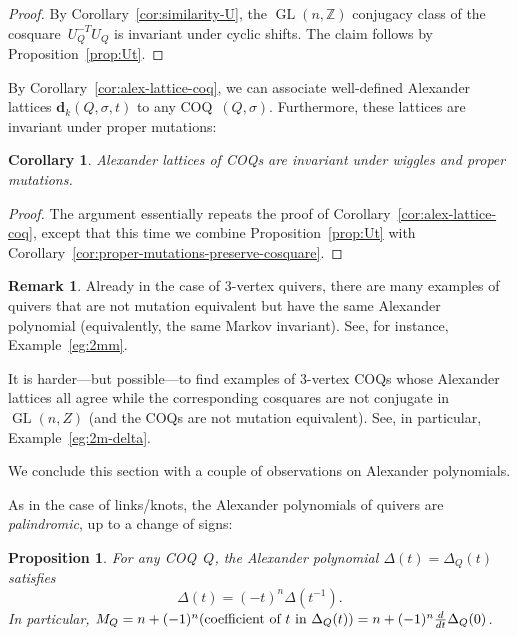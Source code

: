 \documentclass[11pt, letterpaper]{amsart}
\newtheorem{proposition}[theorem]{Proposition}
\newtheorem{corollary}[theorem]{Corollary}
\theoremstyle{definition}
\newtheorem{remark}[theorem]{Remark}
\numberwithin{equation}{section}
\def\ZZ{{\mathbb Z}}
\def\dd{{\mathbf{d}}}
\def\GL{{\operatorname{GL}}}
\begin{document}
\begin{proof}
By Corollary~\ref{cor:similarity-U}, the $\GL(n,\ZZ)$ conjugacy class 
of the cosquare~$U_Q^{-T}U_Q$ is invariant under cyclic shifts.
The claim follows by Proposition~\ref{prop:Ut}.
\end{proof}

By Corollary~\ref{cor:alex-lattice-coq}, we can 
associate well-defined Alexander lattices $\dd_k(Q,\sigma,t)$ to any COQ~$(Q,\sigma)$. 
Furthermore, these lattices are invariant under proper mutations:

\begin{corollary}
\label{cor:alex-lattices-inv}
Alexander lattices of COQs are invariant under wiggles and proper mutations. 
\end{corollary}

\begin{proof}
The argument essentially repeats the proof of Corollary~\ref{cor:alex-lattice-coq},
except that this time we combine Proposition~\ref{prop:Ut} 
with Corollary~\ref{cor:proper-mutations-preserve-cosquare}. 
\end{proof}

\begin{remark}
Already in the case of 3-vertex quivers,
there are many examples of quivers that are not mutation equivalent but 
have the same Alexander polynomial (equivalently, the same Markov invariant). 
See, for instance, Example~\ref{eg:2mm}. 

It is harder---but possible---to find examples of 3-vertex COQs whose Alexander lattices all agree 
while the corresponding cosquares are not conjugate in $\GL(n,Z)$
(and the COQs are not mutation equivalent). 
See, in particular, Example~\ref{eg:2m-delta}. 
\end{remark}


We conclude this section with a couple of observations on Alexander polynomials. 

As in the case of links/knots, 
the Alexander polynomials of quivers are \emph{palindromic}, up to a change of signs: 

\begin{proposition} 
\label{pr:markov-palyndromic}
For any COQ~$Q$, the Alexander polynomial $\Delta(t)=\Delta_Q(t)$ satisfies
\begin{equation*}
\Delta(t) = (-t)^n \Delta(t^{-1}). 
\end{equation*}
In particular, $M_Q=n+(-1)^n (\text{\rm coefficient of $t$ in $\Delta_Q(t)$})=n+(-1)^n \frac{d}{dt}\Delta_Q(0)$. 
\end{proposition}
\end{document}
